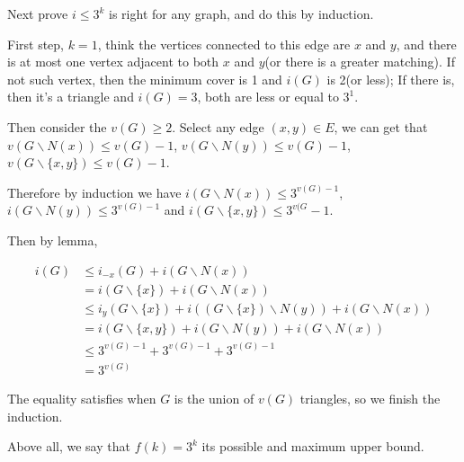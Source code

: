 \documentclass{article}
\begin{document}
Next prove $i \leqslant 3^k$ is right for any graph, and do this by induction.

First step, $k=1$, think the vertices connected to this edge are $x$ and $y$, and there is at most one vertex adjacent to both $x$ and $y$(or there is a greater matching). If not such vertex, then the minimum cover is 1 and $i(G)$ is 2(or less); If there is, then it's a triangle and $i(G) = 3$, both are less or equal to $3^1$.

Then consider the $v(G) \geqslant 2$. Select any edge $(x,y) \in E$, we can get that $v(G\backslash N(x)) \leqslant v(G) - 1$, $v(G \backslash N(y)) \leqslant v(G) - 1$, $v(G \backslash \{ x,y \}) \leqslant v(G) - 1$.

Therefore by induction we have $i(G\backslash N(x)) \leqslant 3^{v(G)-1}$, $i(G\backslash N(y)) \leqslant 3^{v(G) - 1}$ and $i(G \backslash  \{ x,y\}) \leqslant 3^{v(G} - 1$.

Then by lemma,

\begin{align*}
    i(G) & \leqslant i_{-x}(G) + i(G \backslash N(x))\\
    &= i(G \backslash  \{ x\} ) + i(G\backslash  N(x))\\
    &\leqslant i_{y}(G\backslash \{ x \}) + i((G\backslash \{x\}) \backslash N(y) ) + i(G\backslash N(x))\\
    &= i (G\backslash \{x, y\}) + i(G\backslash N(y)) + i(G\backslash N(x))\\
    &\leqslant 3^{v(G) - 1} + 3^{v(G) - 1} + 3^{v(G) - 1}\\
    & = 3^{v(G)}
\end{align*}

The equality satisfies when $G$ is the union of $v(G)$ triangles, so we finish the induction.

Above all, we say that $f(k) = 3^k$ its possible and maximum upper bound.
\end{document}
